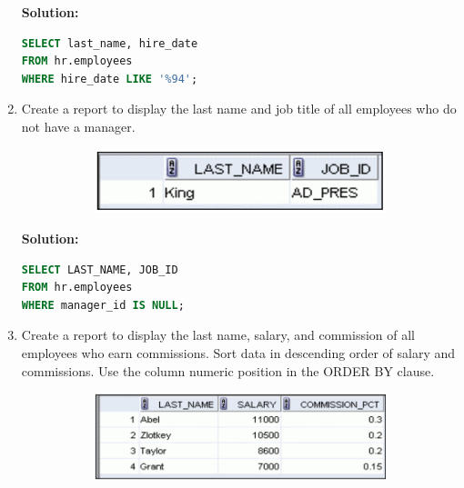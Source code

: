 \documentclass[a4paper,12pt]{article}
\begin{document}
\begin{enumerate}
    \textbf{Solution: }
    \begin{lstlisting}[language=SQL, label={lst:employees_data}]
SELECT last_name, hire_date
FROM hr.employees
WHERE hire_date LIKE '%94';
    \end{lstlisting}

    \item Create a report to display the last name and job title of all employees who do not have a
manager.
\begin{figure}[h]
        \centering
        \begin{subfigure}[b]{0.35\linewidth}
            \centering
            \includegraphics[width=\linewidth]{graphics/28.png}
        \end{subfigure}
    \end{figure}        
    
    \textbf{Solution: }
    \begin{lstlisting}[language=SQL, label={lst:employees_data}]
SELECT LAST_NAME, JOB_ID
FROM hr.employees
WHERE manager_id IS NULL;
    \end{lstlisting}
    \item Create a report to display the last name, salary, and commission of all employees who earn
commissions. Sort data in descending order of salary and commissions.
Use the column numeric position in the ORDER BY clause.
\begin{figure}[h]
        \centering
        \begin{subfigure}[b]{0.6\linewidth}
            \centering
            \includegraphics[width=\linewidth]{graphics/29.png}
        \end{subfigure}
    \end{figure}        
    

\end{enumerate}
\end{document}
